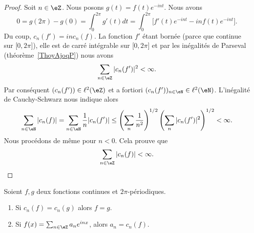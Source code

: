 \begin{proof}
    Soit \( n\in \eZ\). Nous posons \( g(t)=f(t) e^{-int}\). Nous avons
    \begin{equation}
        0=g(2\pi)-g(0)=\int_0^{2\pi}g'(t)dt=\int_0^{2\pi}\big[ f'(t) e^{-int}-inf(t) e^{-int} \big].
    \end{equation}
    Du coup, \( c_n(f')=inc_n(f)\). La fonction \( f'\) étant bornée (parce que continue sur \( \mathopen[ 0 , 2\pi \mathclose]\)), elle est de carré intégrable sur \( \mathopen[ 0 , 2\pi \mathclose]\) et par les inégalités de Parseval (théorème~\ref{ThoyAjoqP}) nous avons
    \begin{equation}
        \sum_{n\in \eZ}| c_n(f') |^2<\infty.
    \end{equation}
    Par conséquent \( (c_n(f'))\in \ell^2(\eZ)\) et a fortiori \( (c_n(f'))_{n\in \eN}\in \ell^2(\eN)\). L'inégalité de Cauchy-Schwarz nous indique alors
    \begin{equation}
        \sum_{n\in \eN}| c_n(f) |=\sum_{n\in \eN}\frac{1}{ n }| c_n(f') |\leq \left( \sum_n\frac{1}{ n^2 } \right)^{1/2}\left( \sum_{n}| c_n(f') |^2 \right)^{1/2}<\infty.
    \end{equation}
    Nous procédons de même pour \( n<0\). Cela prouve que
    \begin{equation}
        \sum_{n\in \eZ}| c_n(f) |<\infty.
    \end{equation}
\end{proof}

\begin{corollary}   \label{CordgtXlC}
    Soient \( f,g\) deux fonctions continues et \( 2\pi\)-périodiques. 
    \begin{enumerate}
        \item       \label{ITEMooPLTIooSDykYF}
    Si \( c_n(f)=c_n(g)\) alors \( f=g\).
\item       \label{ITEMooQMMSooEpIFbt}
    Si \( f(x)=\sum_{n\in \eZ}a_n e^{inx}\), alors \( a_n=c_n(f)\).
    \end{enumerate}
\end{corollary}

